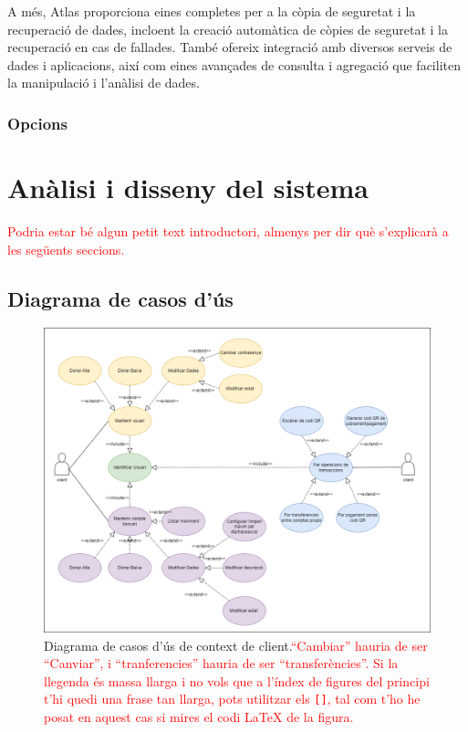 \documentclass[a4paper,12pt,twoside]{ThesisStyle}
\newcommand{\pau}[1]{\textcolor{red}{#1}}
\begin{document}
A més, Atlas proporciona eines completes per a la còpia de seguretat i la recuperació de dades, incloent la creació automàtica de còpies de seguretat i la recuperació en cas de fallades. També ofereix integració amb diversos serveis de dades i aplicacions, així com eines avançades de consulta i agregació que faciliten la manipulació i l'anàlisi de dades.


\subsection{Opcions}
\label{subsec: Opcions}


\chapter{Anàlisi i disseny del sistema}
\label{chp:analisi}

\pau{Podria estar bé algun petit text introductori, almenys per dir què s'explicarà a les següents seccions.}


\section{Diagrama de casos d'ús}
\label{sec: Diagrama de casos d'ús}

\begin{figure}[h]
    \centering
    \includegraphics[width=1\textwidth]{imatges/diagrama caso de uso client.png}
    \caption[Diagrama de casos d'ús de context de client.]{Diagrama de casos d'ús de context de client.\pau{``Cambiar'' hauria de ser ``Canviar'', i ``tranferencies'' hauria de ser ``transferències''.} \pau{Si la llegenda és massa llarga i no vols que a l'índex de figures del principi t'hi quedi una frase tan llarga, pots utilitzar els \texttt{[]}, tal com t'ho he posat en aquest cas si mires el codi LaTeX de la figura.}}
    \label{fig:Diagrama de Casos d'Ús de Context de Client}
\end{figure}
\end{document}
